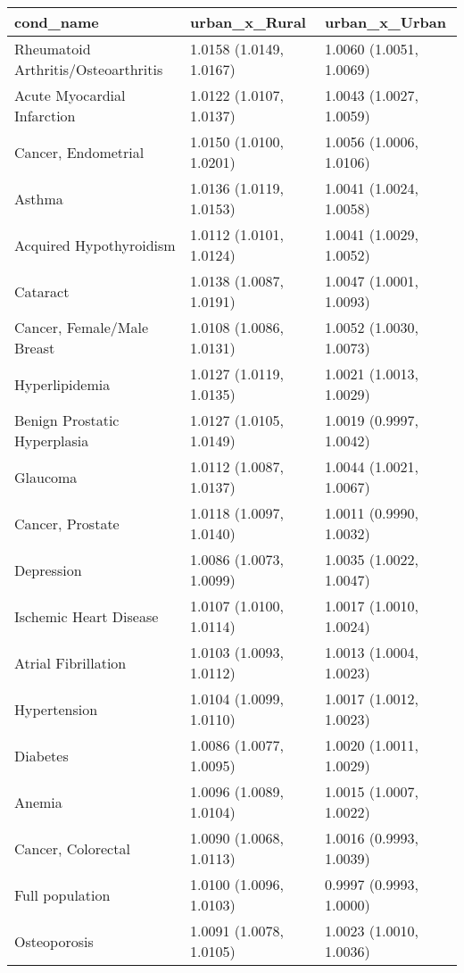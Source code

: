 \begin{table}[ht]
\centering
\begin{tabular}{lll}
  \hline
cond_name & urban_x_Rural & urban_x_Urban \\ 
  \hline
Rheumatoid Arthritis/Osteoarthritis & 1.0158 (1.0149, 1.0167) & 1.0060 (1.0051, 1.0069) \\ 
  Acute Myocardial Infarction & 1.0122 (1.0107, 1.0137) & 1.0043 (1.0027, 1.0059) \\ 
  Cancer, Endometrial & 1.0150 (1.0100, 1.0201) & 1.0056 (1.0006, 1.0106) \\ 
  Asthma & 1.0136 (1.0119, 1.0153) & 1.0041 (1.0024, 1.0058) \\ 
  Acquired Hypothyroidism & 1.0112 (1.0101, 1.0124) & 1.0041 (1.0029, 1.0052) \\ 
  Cataract & 1.0138 (1.0087, 1.0191) & 1.0047 (1.0001, 1.0093) \\ 
  Cancer, Female/Male Breast & 1.0108 (1.0086, 1.0131) & 1.0052 (1.0030, 1.0073) \\ 
  Hyperlipidemia & 1.0127 (1.0119, 1.0135) & 1.0021 (1.0013, 1.0029) \\ 
  Benign Prostatic Hyperplasia & 1.0127 (1.0105, 1.0149) & 1.0019 (0.9997, 1.0042) \\ 
  Glaucoma & 1.0112 (1.0087, 1.0137) & 1.0044 (1.0021, 1.0067) \\ 
  Cancer, Prostate & 1.0118 (1.0097, 1.0140) & 1.0011 (0.9990, 1.0032) \\ 
  Depression & 1.0086 (1.0073, 1.0099) & 1.0035 (1.0022, 1.0047) \\ 
  Ischemic Heart Disease & 1.0107 (1.0100, 1.0114) & 1.0017 (1.0010, 1.0024) \\ 
  Atrial Fibrillation & 1.0103 (1.0093, 1.0112) & 1.0013 (1.0004, 1.0023) \\ 
  Hypertension & 1.0104 (1.0099, 1.0110) & 1.0017 (1.0012, 1.0023) \\ 
  Diabetes & 1.0086 (1.0077, 1.0095) & 1.0020 (1.0011, 1.0029) \\ 
  Anemia & 1.0096 (1.0089, 1.0104) & 1.0015 (1.0007, 1.0022) \\ 
  Cancer, Colorectal & 1.0090 (1.0068, 1.0113) & 1.0016 (0.9993, 1.0039) \\ 
  Full population & 1.0100 (1.0096, 1.0103) & 0.9997 (0.9993, 1.0000) \\ 
  Osteoporosis & 1.0091 (1.0078, 1.0105) & 1.0023 (1.0010, 1.0036) \\ 

\end{tabular}
\end{table}
